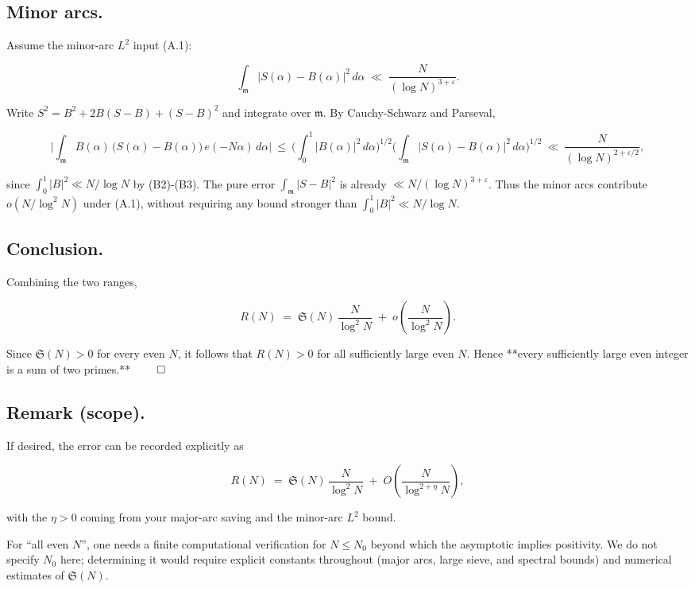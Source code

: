 \documentclass[11pt]{article}
\theoremstyle{definition}
\theoremstyle{remark}
\begin{document}
\subsection*{Minor arcs.}

Assume the minor-arc $L^2$ input (A.1):

$$
	\int_{\mathfrak m} |S(\alpha)-B(\alpha)|^2\,d\alpha
	\;\ll\;\frac{N}{(\log N)^{3+\varepsilon}}.
$$

Write $S^2=B^2+2B(S-B)+(S-B)^2$ and integrate over $\mathfrak m$.
By Cauchy-Schwarz and Parseval,

$$
	\Big|\int_{\mathfrak m} B(\alpha)\,\big(S(\alpha)-B(\alpha)\big)\,e(-N\alpha)\,d\alpha\Big|
	\ \le\ \Big(\int_0^1 |B(\alpha)|^2\,d\alpha\Big)^{1/2}
	\Big(\int_{\mathfrak m}|S(\alpha)-B(\alpha)|^2\,d\alpha\Big)^{1/2}
	\ \ll\ \frac{N}{(\log N)^{2+\varepsilon/2}},
$$

since $\int_0^1|B|^2\ll N/\log N$ by (B2)-(B3). The pure error $\int_{\mathfrak m}|S-B|^2$ is already $\ll N/(\log N)^{3+\varepsilon}$. Thus the minor arcs contribute $o\!\left(N/\log^2 N\right)$ under (A.1), without requiring any bound stronger than $\int_0^1|B|^2\ll N/\log N$.

\subsection*{Conclusion.}

Combining the two ranges,

$$
	R(N)
	\;=\;\mathfrak S(N)\,\frac{N}{\log^2 N}\;+\;o\!\left(\frac{N}{\log^2 N}\right).
$$

Since $\mathfrak S(N)>0$ for every even $N$, it follows that $R(N)>0$ for all sufficiently large even $N$. Hence **every sufficiently large even integer is a sum of two primes.** $\qed$

\subsection*{Remark (scope).}
If desired, the error can be recorded explicitly as

$$
	R(N)\;=\;\mathfrak S(N)\,\frac{N}{\log^2 N}\;+\;O\!\left(\frac{N}{\log^{2+\eta}N}\right),
$$

with the $\eta>0$ coming from your major-arc saving and the minor-arc $L^2$ bound.

For “all even $N$”, one needs a finite computational verification for $N\le N_0$ beyond which the asymptotic implies positivity. We do not specify $N_0$ here; determining it would require explicit constants throughout (major arcs, large sieve, and spectral bounds) and numerical estimates of $\mathfrak S(N)$.
\end{document}
